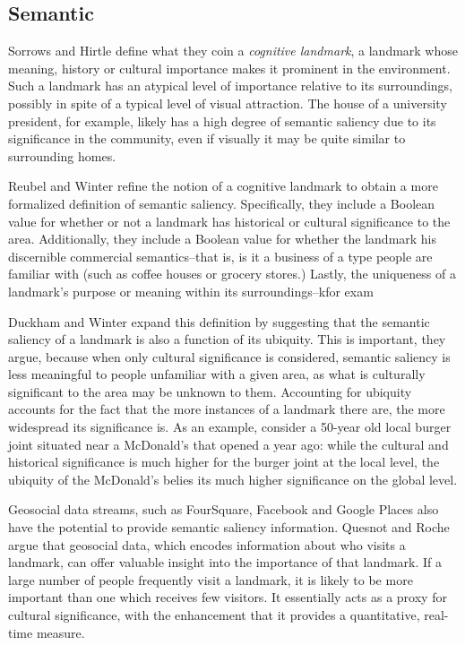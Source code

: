 \subsection{Semantic}

Sorrows and Hirtle \cite{sorrows1999nature} define what they coin a \textit{cognitive landmark}, a landmark whose meaning, history or cultural importance makes it prominent in the environment. Such a landmark has an atypical level of importance relative to its surroundings, possibly in spite of a typical level of visual attraction. The house of a university president, for example, likely has a high degree of semantic saliency due to its significance in the community, even if visually it may be quite similar to surrounding homes.

Reubel and Winter \cite{sorrows1999nature} refine the notion of a cognitive landmark to obtain a more formalized definition of semantic saliency. Specifically, they include a Boolean value for whether or not a landmark has historical or cultural significance to the area. Additionally, they include a Boolean value for whether the landmark his discernible commercial semantics--that is, is it a business of a type people are familiar with (such as coffee houses or grocery stores.) Lastly, the uniqueness of a landmark's purpose or meaning within its surroundings--kfor exam

Duckham and Winter \cite{quesnot2012linked} expand this definition by suggesting that the semantic saliency of a landmark is also a function of its ubiquity. This is important, they argue, because when only cultural significance is considered, semantic saliency is less meaningful to people unfamiliar with a given area, as what is culturally significant to the area may be unknown to them. Accounting for ubiquity accounts for the fact that the more instances of a landmark there are, the more widespread its significance is. As an example, consider a 50-year old local burger joint situated near a McDonald's that opened a year ago: while the cultural and historical significance is much higher for the burger joint at the local level, the ubiquity of the McDonald's belies its much higher significance on the global level.

Geosocial data streams, such as FourSquare, Facebook and Google Places also have the potential to provide semantic saliency information. Quesnot and Roche \cite{quesnot2014measure} argue that geosocial data, which encodes information about who visits a landmark, can offer valuable insight into the importance of that landmark. If a large number of people frequently visit a landmark, it is likely to be more important than one which receives few visitors. It essentially acts as a proxy for cultural significance, with the enhancement that it provides a quantitative, real-time measure. 

